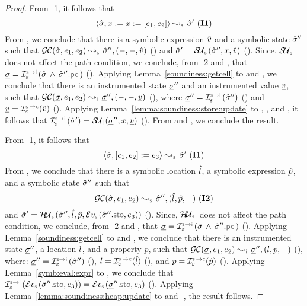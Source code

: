\begin{proof}
 \noindent {} From \hyp{1}, it follows that 
 $$\absbsemrule{\sstate, \jvar := \jvar := [\jsilexpr_1, \jsilexpr_2]}{\sstate'}{\symbolic} \text{ (\ieq{1})}$$
From , we conclude that there is a symbolic expression $\hat{v}$ and a symbolic state $\hat{\sigma}''$ such that 
$\absgetcellrule{\symbolic}{\sstate, \jsilexpr_1, \jsilexpr_2}{\sstate'', (-, -, \sexprv)}$ () 
and $\sstate' = \stupdt{\symbolic}(\sstate'', \jvar, \sexprv)$ (). 
Since, $\stupdt{\symbolic}$ does not affect the path condition, we conclude, from \hyp{2} and , that
$\istate = \interpret{\symbinst}{\senv}(\sstate \, \wedge \, \sstate''.\pcsel)$ (). 
Applying Lemma~\ref{soundiness:getcell} to  and , we conclude that
there is an instrumented state $\underline{\sigma}''$ and an instrumented value $\underline{v}$, such that 
$\absgetcellrule{\instrumented}{\istate, \jsilexpr_1, \jsilexpr_2}{\istate'', (-, -, \ival)}$ (), 
where $\istate'' = \interpret{\symbinst}{\senv}(\sstate'')$ () and $\ival = \interpret{\symbconc}{\senv}(\sexprv)$ (). 
Applying Lemma~\ref{lemma:soundiness:store:update} to , , and , it follows
that  $\interpret{\symbinst}{\senv}(\sstate') = \stupdt{\instrumented}(\istate'', \jvar, \ival)$ (). 
From  and , we conclude the result. 
\vspace{5pt}

 \noindent {}
From \hyp{1}, it follows that 
$$\absbsemrule{\sstate, [\jsilexpr_1, \jsilexpr_2] := \jsilexpr_3}{\sstate'}{\symbolic} \text{ (\ieq{1})}$$
From , we conclude that there is a symbolic location $\hat{l}$, a symbolic expression $\hat{p}$, and a symbolic state $\hat{\sigma}''$ such that 
$$\absgetcellrule{\symbolic}{\sstate, \jsilexpr_1, \jsilexpr_2}{\sstate'', (\sloc, \sexprp, -)} \text{ (\ieq{2})}$$ and 
$\sstate' = \hpupdt{\symbolic}(\sstate'', \sloc, \sexprp, \evalexpr{\symbolic}(\sstate''.\stosel, \jsilexpr_3))$ (). 
Since, $\hpupdt{\symbolic}$ does not affect the path condition, we conclude, from \hyp{2} and , that
$\istate = \interpret{\symbinst}{\senv}(\sstate \, \wedge \, \sstate''.\pcsel)$ (). 
Applying Lemma~\ref{soundiness:getcell} to  and , we conclude that
there is an instrumented state $\underline{\sigma}''$, a location $l$, and a property $p$, such that 
$\absgetcellrule{\instrumented}{\istate, \jsilexpr_1, \jsilexpr_2}{\istate'', (\loc, p, -)}$ (), 
where: $\istate'' = \interpret{\symbinst}{\senv}(\sstate'')$ (), 
 $\loc = \interpret{\symbconc}{\senv}(\sloc)$ (), and  $p = \interpret{\symbconc}{\senv}(\sexprp)$ ().
Applying Lemma~\ref{symb:eval:expr} to , we conclude that 
$\interpret{\symbinst}{\senv}(\evalexpr{\symbolic}(\sstate''.\stosel, \jsilexpr_3)) = \evalexpr{\symbolic}(\istate''.\stosel, \jsilexpr_3)$ (). 
Applying Lemma~\ref{lemma:soundiness:heap:update} to  and -, the result follows.
\vspace{5pt} 


\end{proof}
